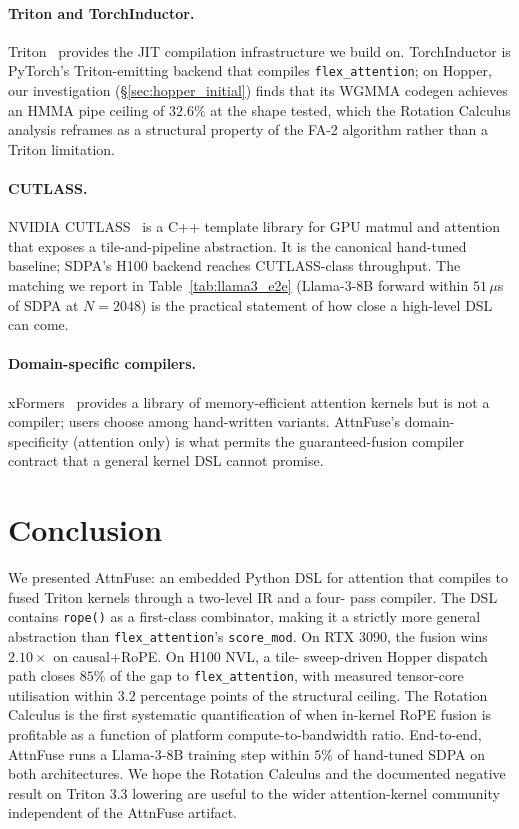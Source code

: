 \documentclass[10pt,twocolumn]{article}
\begin{document}
\paragraph{Triton and TorchInductor.}
Triton~\cite{tillet2019triton} provides the JIT compilation
infrastructure we build on. TorchInductor is PyTorch's
Triton-emitting backend that compiles \texttt{flex\_attention}; on
Hopper, our investigation (\S\ref{sec:hopper_initial}) finds that
its WGMMA codegen achieves an HMMA pipe ceiling of $32.6\%$ at the
shape tested, which the Rotation Calculus analysis reframes as a
structural property of the FA-2 algorithm rather than a Triton
limitation.

\paragraph{CUTLASS.}
NVIDIA CUTLASS~\cite{thakkar2023cutlass} is a C++ template library
for GPU matmul and attention that exposes a tile-and-pipeline
abstraction. It is the canonical hand-tuned baseline; SDPA's H100
backend reaches CUTLASS-class throughput. The matching we report in
Table~\ref{tab:llama3_e2e} (Llama-3-8B forward within $51\,\mu$s of
SDPA at $N{=}2048$) is the practical statement of how close a
high-level DSL can come.

\paragraph{Domain-specific compilers.}
xFormers~\cite{lefaudeux2022xformers} provides a library of
memory-efficient attention kernels but is not a compiler; users
choose among hand-written variants. AttnFuse's domain-specificity
(attention only) is what permits the guaranteed-fusion compiler
contract that a general kernel DSL cannot promise.

\section{Conclusion}

We presented AttnFuse: an embedded Python DSL for attention that
compiles to fused Triton kernels through a two-level IR and a four-
pass compiler. The DSL contains \texttt{rope()} as a first-class
combinator, making it a strictly more general abstraction than
\texttt{flex\_attention}'s \texttt{score\_mod}. On RTX 3090, the
fusion wins $2.10\times$ on causal+RoPE. On H100 NVL, a tile-
sweep-driven Hopper dispatch path closes $85\%$ of the gap to
\texttt{flex\_attention}, with measured tensor-core utilisation
within $3.2$ percentage points of the structural ceiling. The
Rotation Calculus is the first systematic quantification of when
in-kernel RoPE fusion is profitable as a function of platform
compute-to-bandwidth ratio. End-to-end, AttnFuse runs a Llama-3-8B
training step within $5\%$ of hand-tuned SDPA on both
architectures. We hope the Rotation Calculus and the documented
negative result on Triton 3.3 lowering are useful to the wider
attention-kernel community independent of the AttnFuse artifact.
\end{document}
